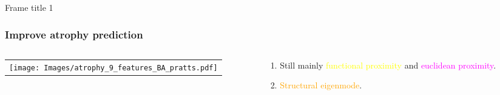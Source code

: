 \documentclass{beamer}
\begin{document}
\begin{frame}{Frame title 1}
\frametitle{Improve atrophy prediction}
  \begin{center} 
    \begin{columns}

      \begin{column}{0.7\textwidth}
        \begin{tabular}{l} 
	   \texttt{[image: Images/atrophy\_9\_features\_BA\_pratts.pdf]}\\
        \end{tabular}   
      \end{column}

      \begin{column}{0.3\textwidth}
		\begin{enumerate}
		\item Still mainly {\textcolor{yellow}{functional proximity}} and {\textcolor{magenta}{euclidean proximity}}.
		\item {\textcolor{orange}{Structural eigenmode}}.				
		\end{enumerate}
      \end{column}

     \end{columns}
   \end{center}
\end{frame}
%
%
%
\end{document}
